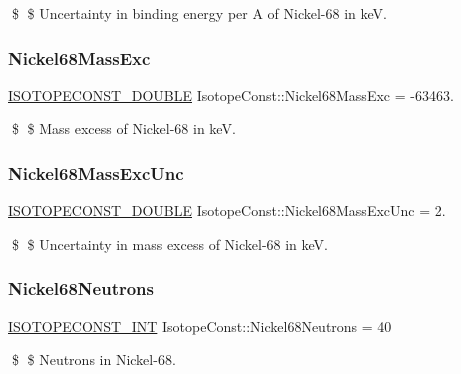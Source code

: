 \$ \$ Uncertainty in binding energy per A of Nickel-\/68 in keV. \mbox{\label{group___isotope_const-_nickel-_ni68_gad3c9e7d89345f97fa87b347cba1008e9}} 
\subsubsection{\texorpdfstring{Nickel68\+Mass\+Exc}{Nickel68MassExc}}
{\footnotesize\ttfamily \mbox{\hyperlink{group___isotope_const-_macros_ga8f45a7272ce02c0b4c65c44636ed719a}{I\+S\+O\+T\+O\+P\+E\+C\+O\+N\+S\+T\+\_\+\+D\+O\+U\+B\+LE}} Isotope\+Const\+::\+Nickel68\+Mass\+Exc = -\/63463.}

\$ \$ Mass excess of Nickel-\/68 in keV. \mbox{\label{group___isotope_const-_nickel-_ni68_ga45a00dacae69159d94966f273e9f3776}} 
\subsubsection{\texorpdfstring{Nickel68\+Mass\+Exc\+Unc}{Nickel68MassExcUnc}}
{\footnotesize\ttfamily \mbox{\hyperlink{group___isotope_const-_macros_ga8f45a7272ce02c0b4c65c44636ed719a}{I\+S\+O\+T\+O\+P\+E\+C\+O\+N\+S\+T\+\_\+\+D\+O\+U\+B\+LE}} Isotope\+Const\+::\+Nickel68\+Mass\+Exc\+Unc = 2.}

\$ \$ Uncertainty in mass excess of Nickel-\/68 in keV. \mbox{\label{group___isotope_const-_nickel-_ni68_ga2861a1a3d20d8120905fc45b3f7c608f}} 
\subsubsection{\texorpdfstring{Nickel68\+Neutrons}{Nickel68Neutrons}}
{\footnotesize\ttfamily \mbox{\hyperlink{group___isotope_const-_macros_ga5f18360b3e99483a35c32d789e62621c}{I\+S\+O\+T\+O\+P\+E\+C\+O\+N\+S\+T\+\_\+\+I\+NT}} Isotope\+Const\+::\+Nickel68\+Neutrons = 40}

\$ \$ Neutrons in Nickel-\/68. \mbox{\label{group___isotope_const-_nickel-_ni68_gae4d1bd6dc23172f12ec761d57530d1ea}} 
